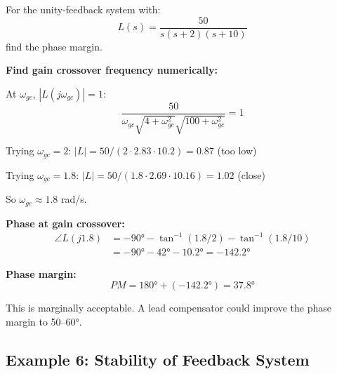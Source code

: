 \begin{example}
\label{ex:pm_bode}
For the unity-feedback system with:
\begin{equation}
L(s) = \frac{50}{s(s+2)(s+10)}
\end{equation}
find the phase margin.

\textbf{Find gain crossover frequency numerically:}

At $\omega_{gc}$, $|L(j\omega_{gc})| = 1$:
\begin{equation}
\frac{50}{\omega_{gc}\sqrt{4+\omega_{gc}^2}\sqrt{100+\omega_{gc}^2}} = 1
\end{equation}

Trying $\omega_{gc} = 2$: $|L| = 50/(2 \cdot 2.83 \cdot 10.2) = 0.87$ (too low)

Trying $\omega_{gc} = 1.8$: $|L| = 50/(1.8 \cdot 2.69 \cdot 10.16) = 1.02$ (close)

So $\omega_{gc} \approx 1.8$ rad/s.

\textbf{Phase at gain crossover:}
\begin{align}
\angle L(j1.8) &= -90° - \tan^{-1}(1.8/2) - \tan^{-1}(1.8/10) \\
&= -90° - 42° - 10.2° = -142.2°
\end{align}

\textbf{Phase margin:}
\begin{equation}
PM = 180° + (-142.2°) = 37.8°
\end{equation}

This is marginally acceptable. A lead compensator could improve the phase margin to 50--60°.
\end{example}

\subsection{Example 6: Stability of Feedback System}

